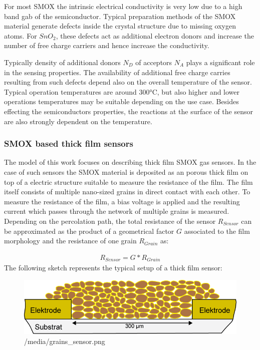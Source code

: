\documentclass[11pt]{article}
\begin{document}
For most SMOX the intrinsic electrical conductivity is very low due to a
high band gab of the semiconductor. Typical preparation methods of the
SMOX material generate defects inside the crystal structure due to
missing oxygen atoms. For \(SnO_2\), these defects act as additional
electron donors and increase the number of free charge carriers and
hence increase the conductivity.

Typically density of additional donors \(N_D\) of acceptors \(N_A\)
plays a significant role in the sensing properties. The availability of
additional free charge carries resulting from such defects depend also
on the overall temperature of the sensor. Typical operation temperatures
are around 300°C, but also higher and lower operations temperatures may
be suitable depending on the use case. Besides effecting the
semiconductors properties, the reactions at the surface of the sensor
are also strongly dependent on the temperature.

\hypertarget{smox-based-thick-film-sensors}{%
\subsubsection{SMOX based thick film
sensors}\label{smox-based-thick-film-sensors}}

The model of this work focuses on describing thick film SMOX gas
sensors. In the case of such sensors the SMOX material is deposited as
an porous thick film on top of a electric structure suitable to measure
the resistance of the film. The film itself consists of multiple
nano-sized grains in direct contact with each other. To measure the
resistance of the film, a bias voltage is applied and the resulting
current which passes through the network of multiple grains is measured.
Depending on the percolation path, the total resistance of the sensor
\(R_{Sensor}\) can be approximated as the product of a geometrical
factor \(G\) associated to the film morphology and the resistance of one
grain \(R_{Grain}\) as:

\begin{align}
R_{Sensor}  = G * R_{Grain} \label{r_sensor_r_grain}\tag{Resistance of sensor}
\end{align} The following sketch represents the typical setup of a thick
film sensor:

\begin{figure}
\centering
\includegraphics{media/grains_sensor.png}
\caption{/media/grains\_sensor.png}
\end{figure}
\end{document}
